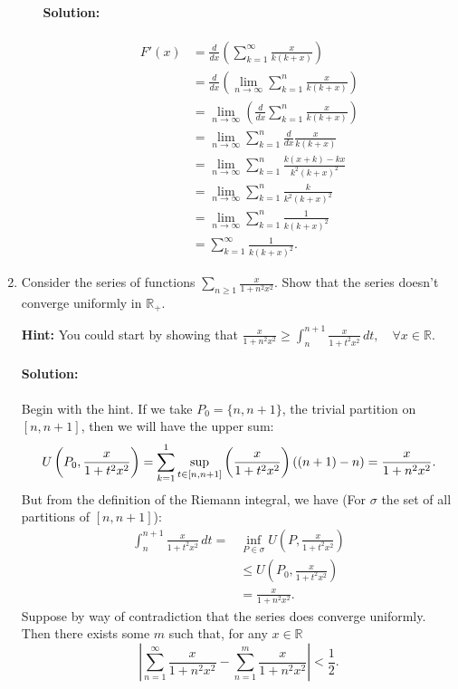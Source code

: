 \documentclass{article}
\begin{document}
\begin{enumerate}
\begin{enumerate}
        \paragraph{Solution: }
        \begin{align*}
            F'(x)&= \frac{d}{dx}\left(  \sum_{k=1}^{\infty} \frac{x}{k(k+x)}\right)  \\
                &= \frac{d}{dx}\left( \lim_{n \to \infty} \sum_{k=1}^{n} \frac{x}{k(k+x)}\right)  \\
                &= \lim_{n \to \infty}\left( \frac{d}{dx}\sum_{k=1}^{n} \frac{x}{k(k+x)}  \right)\\
                &= \lim_{n \to \infty} \sum_{k=1}^{n} \frac{d}{dx}\frac{x}{k(k+x)}  \\
                &= \lim_{n \to \infty} \sum_{k=1}^{n} \frac{k(x+k)-kx}{k^2(k+x)^2}  \\
                &= \lim_{n \to \infty} \sum_{k=1}^{n} \frac{k}{k^2(k+x)^2}  \\
                &= \lim_{n \to \infty} \sum_{k=1}^{n} \frac{1}{k(k+x)^2}  \\
                &= \sum_{k=1}^{\infty} \frac{1}{k(k+x)^2} 
        .\end{align*}

  \end{enumerate}
  \newpage
\item Consider the series of functions $\sum_{n\geq 1}^{} \frac{x}{1+n^2x^2}$. Show that the series doesn't converge uniformly in $\mathbb{R}_+$.

  \textbf{Hint:} You could start by showing that $\frac{x}{1+n^2x^2}\geq \int_{n}^{n+1} \frac{x}{1+t^2x^2} \, d t, \quad \forall x\in \mathbb{R}$.

  \paragraph{Solution: }Begin with the hint. If we take $P_{0}=\{n,n+1\} $, the trivial partition on $[n,n+1]$, then we will have the upper sum:
  \[
       U\left(P_0,\frac{x}{1+t^2x^2}\right)=\sum_{k=1}^{1} \sup_{t\in [n,n+1]}\left( \frac{x}{1+t^2x^2} \right) ((n+1)-n)\\
       = \frac{x}{1+n^2x^2} \\
  .\] 
  But from the definition of the Riemann integral, we have (For $\sigma$ the set of all partitions of $[n,n+1]$):
  \begin{align*}
      \int_{n}^{n+1} \frac{x}{1+t^2x^2} \, d t=&\inf_{P\in \sigma}U\left(P,\frac{x}{1+t^2x^2}\right)\\
                        &\leq U\left( P_0,\frac{x}{1+t^2x^2} \right) \\
      &= \frac{x}{1+n^2x^2}
  .\end{align*}
  Suppose by way of contradiction that the series does converge uniformly. Then there exists some $m$ such that, for any $x\in \mathbb{R}$
  \[
  \left| \sum_{n=1}^{\infty} \frac{x}{1+n^2x^2}-\sum_{n=1}^{m} \frac{x}{1+n^2x^2} \right| <\frac{1}{2}
  .\] 


\end{enumerate}
\end{document}
